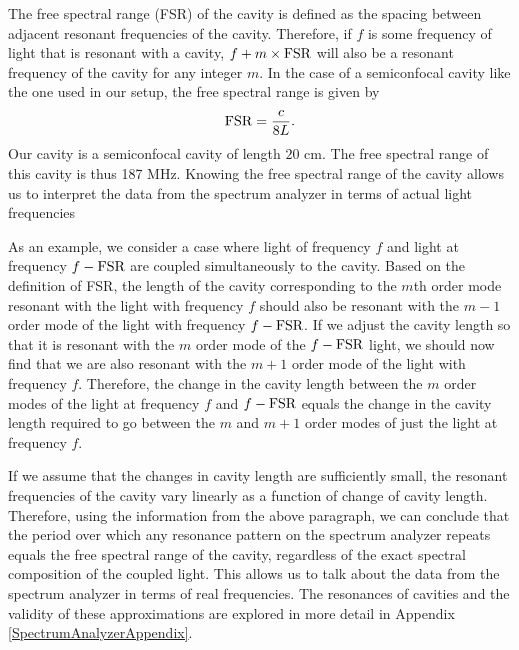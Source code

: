 The free spectral range (FSR) of the cavity is defined as the spacing between adjacent resonant frequencies of the cavity. Therefore, if $f$ is some frequency of light that is resonant with a cavity, $f+m\times \textnormal{FSR}$ will also be a resonant frequency of the cavity for any integer $m$. In the case of a semiconfocal cavity like the one used in our setup, the free spectral range is given by 
\begin{equation}
    \textnormal{FSR}=\frac{c}{8L}.
\end{equation}
Our cavity is a semiconfocal cavity of length $20$ cm. The free spectral range of this cavity is thus 187 MHz. 
Knowing the free spectral range of the cavity allows us to interpret the data from the spectrum analyzer in terms of actual light frequencies

As an example, we consider a case where light of frequency $f$ and light at frequency $f-\textnormal{FSR}$ are coupled simultaneously to the cavity. Based on the definition of FSR, the length of the cavity corresponding to the $m$th order mode resonant with the light with frequency $f$ should also be resonant with the $m-1$ order mode of the light with frequency $f-\textnormal{FSR}$.
If we adjust the cavity length so that it is resonant with the $m$ order mode of the $f-\textnormal{FSR}$ light, we should now find that we are also resonant with the $m+1$ order mode of the light with frequency $f$. Therefore, the change in the cavity length between the $m$ order modes of the light at frequency $f$ and $f-\textnormal{FSR}$ equals the change in the cavity length required to go between the $m$ and $m+1$ order modes of just the light at frequency $f$. 

If we assume that the changes in cavity length are sufficiently small, the resonant frequencies of the cavity vary linearly as a function of change of cavity length. Therefore, using the information from the above paragraph, we can conclude that the period over which any resonance pattern on the spectrum analyzer repeats equals the free spectral range of the cavity, regardless of the exact spectral composition of the coupled light. This allows us to talk about the data from the spectrum analyzer in terms of real frequencies. 
The resonances of cavities and the validity of these approximations are explored in more detail in Appendix\,\ref{SpectrumAnalyzerAppendix}.

